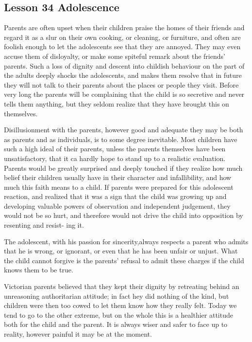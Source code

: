 \documentclass[kindlepaper]{BHCexam4kindle}
\begin{document}
\subsection{Lesson 34
Adolescence}
\par
Parents are often upset when their children praise the homes of their friends and
regard it as a slur on their own cooking, or cleaning, or furniture, and often are
foolish enough to let the adolescents see that they are annoyed. They may even
accuse them of disloyalty, or make some spiteful remark about the friends'
parents. Such a loss of dignity and descent into childish behaviour on the part of
the adults deeply shocks the adolescents, and makes them resolve that in future
they will not talk to their parents about the places or people they visit. Before
very long the parents will be complaining that the child is so secretive and never
tells them anything, but they seldom realize that they have brought this on
themselves.
\par
Disillusionment with the parents, however good and adequate they may be
both as parents and as individuals, is to some degree inevitable. Most children
have such a high ideal of their parents, unless the parents themselves have been
unsatisfactory, that it ca hardly hope to stand up to a realistic evaluation. Parents
would be greatly surprised and deeply touched if they realize how much belief
their children usually have in their character and infallibility, and how much this
faith means to a child. If parents were prepared for this adolescent reaction, and
realized that it was a sign that the child was growing up and developing valuable
powers of observation and independent judgement, they would not be so hurt,
and therefore would not drive the child into opposition by resenting and resist-
ing it.
\par
The adolescent, with his passion for sincerity,always respects a parent who
admits that he is wrong, or ignorant, or even that he has been unfair or unjust.
What the child cannot forgive is the parents' refusal to admit these charges if the
child knows them to be true.
\par
Victorian parents believed that they kept their dignity by retreating behind an
unreasoning authoritarian attitude; in fact hey did nothing of the kind, but
children were then too cowed to let them know how they really felt. Today we
tend to go to the other extreme, but on the whole this is a healthier attitude both
for the child and the parent. It is always wiser and safer to face up to reality,
however painful it may be at the moment.
\clearpage
\end{document}
